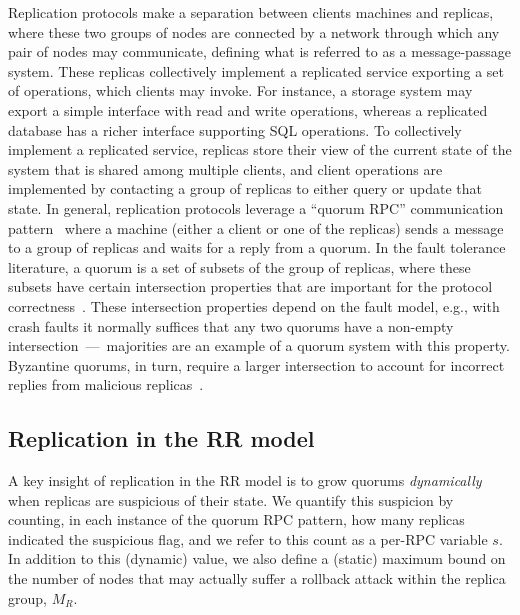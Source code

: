 Replication protocols make a separation between clients machines
and replicas, where these two groups of nodes are connected by a
network through which any pair of nodes may communicate, defining
what is referred to as a message-passage system. These replicas
collectively implement a replicated service exporting a set of
operations, which clients may invoke. For instance, a storage
system may export a simple interface with read and write
operations, whereas a replicated database has a richer interface
supporting SQL operations. To collectively implement a replicated
service, replicas store their view of the current state of the
system that is shared among multiple clients, and client
operations are implemented by contacting a group of replicas to
either query or update that state. In general, replication
protocols leverage a ``quorum RPC'' communication
pattern~\cite{Malkhi:Reiter:BQS:98,lorenzo:framework} where a
machine (either a client or one of the replicas) sends a message
to a group of replicas and waits for a reply from a quorum. In
the fault tolerance literature, a quorum is a set of subsets of
the group of replicas, where these subsets have certain
intersection properties that are important for the protocol
correctness~\cite{gifford:quorums}. These intersection properties
depend on the fault model, e.g., with crash faults it normally
suffices that any two quorums have a non-empty
intersection~---~majorities are an example of a quorum system
with this property. Byzantine quorums, in turn, require a larger
intersection to account for incorrect replies from malicious
replicas~\cite{Malkhi:Reiter:BQS:98}.

\subsection{Replication in the \ac{RR} model}

A key insight of replication in the \ac{RR} model is to grow quorums
\emph{dynamically} when replicas are suspicious of their state.
We quantify this suspicion by counting, in each instance of the
quorum RPC pattern, how many replicas indicated the suspicious
flag, and we refer to this count as a per-RPC variable $s$.
In addition to this (dynamic) value, we also define a (static)
maximum bound on the number of nodes that may actually
suffer a rollback attack within the replica group, $M_R$.

